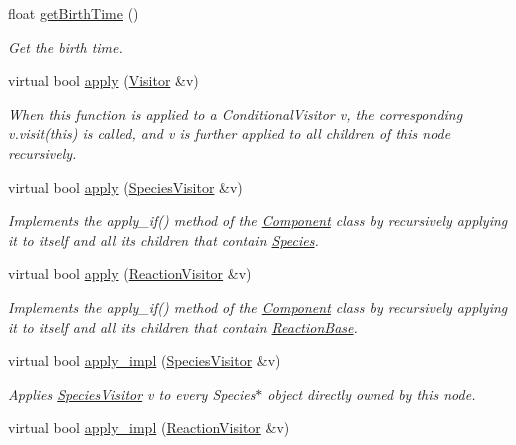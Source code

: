 \begin{DoxyCompactItemize}
float \hyperlink{classBead_afa239062c738d1db95a1456c9b357a68}{get\+Birth\+Time} ()
\begin{DoxyCompactList}\small\item\em Get the birth time. \end{DoxyCompactList}\item 
virtual bool \hyperlink{classComponent_a06be9328d615af20a155e9060def1470}{apply} (\hyperlink{classVisitor}{Visitor} \&v)
\begin{DoxyCompactList}\small\item\em When this function is applied to a Conditional\+Visitor v, the corresponding v.\+visit(this) is called, and v is further applied to all children of this node recursively. \end{DoxyCompactList}\item 
virtual bool \hyperlink{classComponent_a0f1cd7534ba27c165a1574adc8d422dd}{apply} (\hyperlink{classSpeciesVisitor}{Species\+Visitor} \&v)
\begin{DoxyCompactList}\small\item\em Implements the apply\+\_\+if() method of the \hyperlink{classComponent}{Component} class by recursively applying it to itself and all its children that contain \hyperlink{classSpecies}{Species}. \end{DoxyCompactList}\item 
virtual bool \hyperlink{classComponent_aa911f6c2be71a33eeeb44f03c82cd421}{apply} (\hyperlink{classReactionVisitor}{Reaction\+Visitor} \&v)
\begin{DoxyCompactList}\small\item\em Implements the apply\+\_\+if() method of the \hyperlink{classComponent}{Component} class by recursively applying it to itself and all its children that contain \hyperlink{classReactionBase}{Reaction\+Base}. \end{DoxyCompactList}\item 
virtual bool \hyperlink{classComponent_a20f6f5a1f7da3238c069dfc35f174a4b}{apply\+\_\+impl} (\hyperlink{classSpeciesVisitor}{Species\+Visitor} \&v)
\begin{DoxyCompactList}\small\item\em Applies \hyperlink{classSpeciesVisitor}{Species\+Visitor} v to every Species$\ast$ object directly owned by this node. \end{DoxyCompactList}\item 
virtual bool \hyperlink{classComponent_ac9296f41e0b9c254d5adea9df3b4b07a}{apply\+\_\+impl} (\hyperlink{classReactionVisitor}{Reaction\+Visitor} \&v)

\end{DoxyCompactItemize}
